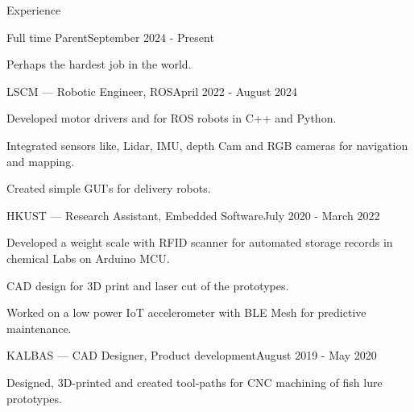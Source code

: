 \documentclass[
	a4paper, %
	11pt, %
]{resume} %
\begin{document}
\begin{rSection}{Experience}

	\begin{rSubsection}{Full time Parent}{September 2024 - Present}{}{}
		\item Perhaps the hardest job in the world.
	\end{rSubsection}


	\begin{rSubsection}{LSCM --- Robotic Engineer, ROS}{April 2022 - August 2024}{}{}
		\item Developed motor drivers and for ROS robots in C++ and Python.
		\item Integrated sensors like, Lidar, IMU, depth Cam and RGB cameras for navigation and mapping.
		\item Created simple GUI's for delivery robots.
	\end{rSubsection}


	\begin{rSubsection}{HKUST --- Research Assistant, Embedded Software}{July 2020 - March 2022}{}{}
		\item Developed a weight scale with RFID scanner for automated storage records in chemical Labs on Arduino MCU.
		\item CAD design for 3D print and laser cut of the prototypes.
		\item Worked on a low power IoT accelerometer with BLE Mesh for predictive maintenance.
	\end{rSubsection}


	\begin{rSubsection}{KALBAS --- CAD Designer, Product development}{August 2019 - May 2020}{}{}
		\item Designed, 3D-printed and created tool-paths for CNC machining of fish lure prototypes.
	\end{rSubsection}

\end{rSection}


\end{document}
